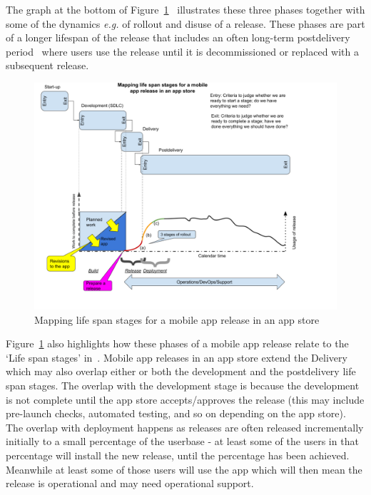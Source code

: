 The graph at the bottom of Figure~\ref{fig:mobile-app-life-span-stages}~ illustrates these three phases together with some of the dynamics \emph{e.g.} of rollout and disuse of a release. These phases are part of a longer lifespan of the release that includes an often long-term postdelivery period~ where users use the release until it is decommissioned or replaced with a subsequent release.

\begin{figure}
    \includegraphics[width=\linewidth]{images/my/mobile-app-life-span-stages-21-sep-2021.pdf}
    \caption{Mapping life span stages for a mobile app release in an app store}
    \label{fig:mobile-app-life-span-stages}
\end{figure}

Figure~\ref{fig:mobile-app-life-span-stages} also highlights how these phases of a mobile app release relate to the `Life span stages' in~. Mobile app releases in an app store extend the Delivery which may also overlap either or both the development and the postdelivery life span stages. The overlap with the development stage is because the development is not complete until the app store accepts/approves the release (this may include pre-launch checks, automated testing, and so on depending on the app store). The overlap with deployment happens as releases are often released incrementally initially to a small percentage of the userbase - at least some of the users in that percentage will install the new release, until the percentage has been achieved. Meanwhile at least some of those users will use the app which will then mean the release is operational and may need operational support.


